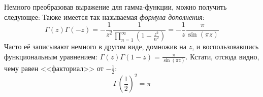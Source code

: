 \documentclass[a4paper]{report}
\begin{document}
    Немного преобразовав выражение для гамма-функции, можно получить следующее:
    Также имеется так называемая \emph{формула дополнения}:
    \[\Gamma(z)\Gamma(-z) = -\frac{1}{z^2}\frac{1}{\prod\limits_{n = 1}^{\infty}\left(1 - \frac{z^2}{n^2}\right)} = -\frac{1}{z}\frac{\pi}{\sin \left(\pi z\right)}\]
    Часто её записывают немного в другом виде, домножив на $z$, и воспользовавшись функциональным уравнением: $\Gamma(z)\Gamma(1 - z) = \frac{\pi}{\sin \left(\pi z\right)}$.
    Кстати, отсюда видно, чему равен <<факториал>> от $-\frac{1}{2}$: \[\Gamma\left(\frac{1}{2}\right)^2 = \pi\]
\end{document}
